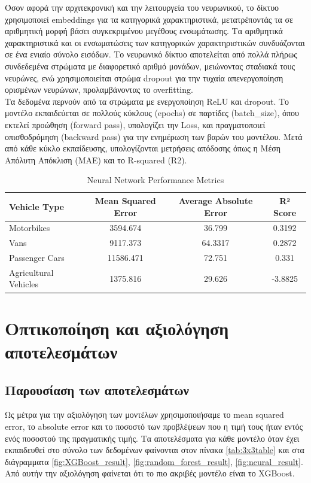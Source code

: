 \documentclass{llncs}
\begin{document}
Όσον αφορά την αρχιτεκρονική και την λειτουργεία του νευρωνικού,
το δίκτυο χρησιμοποιεί embeddings για τα κατηγορικά χαρακτηριστικά, μετατρέποντάς τα σε αριθμητική μορφή βάσει συγκεκριμένου μεγέθους ενσωμάτωσης.
Τα αριθμητικά χαρακτηριστικά και οι ενσωματώσεις των κατηγορικών χαρακτηριστικών συνδυάζονται σε ένα ενιαίο σύνολο εισόδων. Το νευρωνικό δίκτυο αποτελείται από πολλά πλήρως συνδεδεμένα στρώματα 
με διαφορετικό αριθμό μονάδων, μειώνοντας σταδιακά τους νευρώνες, ενώ χρησιμοποιείται στρώμα dropout για την τυχαία απενεργοποίηση ορισμένων νευρώνων, προλαμβάνοντας το overfitting.\\
Τα δεδομένα περνούν από τα στρώματα με ενεργοποίηση ReLU και dropout. Το μοντέλο εκπαιδεύεται σε πολλούς κύκλους (epochs) σε παρτίδες (batch\_size), όπου εκτελεί προώθηση (forward pass), υπολογίζει την Loss, 
και πραγματοποιεί οπισθοδρόμηση (backward pass) για την ενημέρωση των βαρών του μοντέλου. Μετά από κάθε κύκλο εκπαίδευσης, υπολογίζονται μετρήσεις απόδοσης όπως η Μέση Απόλυτη Απόκλιση (MAE) και το R-squared (R2).

\begin{table}[h!]
    \centering
    \begin{tabular}{|l|c|c|c|}
        \hline
        Vehicle Type & Mean Squared Error & Average Absolute Error & R² Score \\
        \hline
        Motorbikes & 3594.674 & 36.799 & 0.3192 \\
        Vans & 9117.373 & 64.3317 & 0.2872 \\
        Passenger Cars & 11586.471 & 72.751 & 0.331 \\
        Agricultural Vehicles & 1375.816 & 29.626 & -3.8825 \\
        \hline
    \end{tabular}
    \caption{Neural Network Performance Metrics}
\end{table}


\section{Oπτικοποίηση και αξιολόγηση αποτελεσμάτων}

\subsection{Παρουσίαση των αποτελεσμάτων}

Ως μέτρα για την αξιολόγηση των μοντέλων χρησιμοποιήσαμε το mean squared error, το absolute error και το ποσοστό των προβλέψεων που η τιμή τους 
ήταν εντός ενός ποσοστού της πραγματικής τιμής. Τα αποτελέσματα για κάθε μοντέλο όταν έχει εκπαιδευθεί στο σύνολο των δεδομένων
φαίνονται στον πίνακα \ref{tab:3x3table} και στα διάγραμματα \ref{fig:XGBoost_result}, 
\ref{fig:random_forest_result}, \ref{fig:neural_result}. Από αυτήν την αξιολόγηση φαίνεται ότι το πιο ακριβές μοντέλο
είναι το XGBoost.
\end{document}
